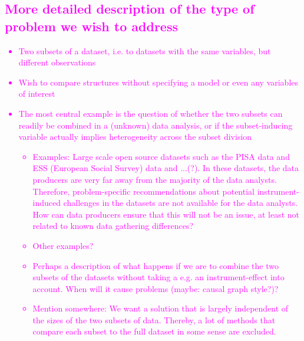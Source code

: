 \documentclass[titlepage,11pt,twoside]{article}
\newcommand{\hl}[1]{\textcolor{magenta}{#1}}
\begin{document}
\subsection{\hl{More detailed description of the type of problem we wish to address}}
\hl{
\begin{itemize}
\item Two subsets of a dataset, i.e. to datasets with the same variables, but different observations
\item Wish to compare structures without specifying a model or even any variables of interest
\item The most central example is the question of whether the two subsets can readily be combined in a (unknown) data analysis, or if the subset-inducing variable actually implies heterogeneity across the subset division
	\begin{itemize}
		\item Examples: Large scale open source datasets such as the PISA data and ESS (European Social Survey) data and ...(?). In these datasets, the data producers are very far away from the majority of the data analysts. Therefore, problem-specific recommendations about potential instrument-induced challenges in the datasets are not available for the data analysts. How can data producers ensure that this will not be an issue, at least not related to known data gathering differences?
		\item Other examples?
		\item Perhaps a description of what happens if we are to combine the two subsets of the datasets without taking a e.g. an instrument-effect into account. When will it cause problems (maybe: causal graph style?)?
		\item Mention somewhere: We want a solution that is largely independent of the sizes of the two subsets of data. Thereby, a lot of methods that compare each subset to the full dataset in some sense are excluded.
	\end{itemize}
\end{itemize}
}
\end{document}
